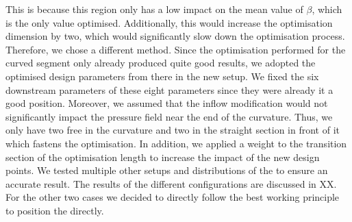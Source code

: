 This is because this region only has a low impact on the mean value of $\beta$, which is the only value optimised.
Additionally, this would increase the optimisation dimension by two, which would significantly slow down the optimisation process.
Therefore, we chose a different method. 
Since the optimisation performed for the curved segment only already produced quite good results, we adopted the optimised design parameters from there in the new setup. 
We fixed the six downstream parameters of these eight parameters since they were already it a good position.
Moreover, we assumed that the inflow modification  would not significantly impact the pressure field near the end of the curvature.
Thus, we only have two free  in the curvature and two in the straight section in front of it which fastens the optimisation.
In addition, we applied a weight to the transition section of the optimisation length to increase the impact of the new design points.
We tested multiple other setups and distributions of the  to ensure an accurate result.
The results of the different configurations are discussed in XX.
For the other two cases we decided to directly follow the best working principle to position the  directly.

